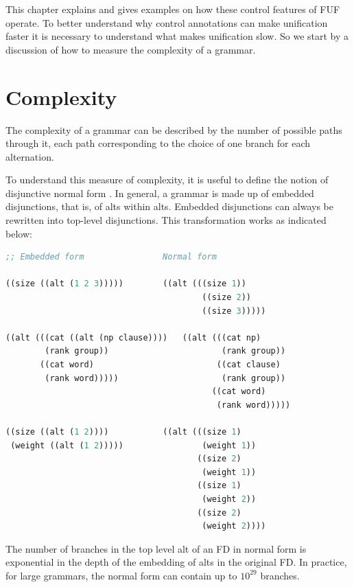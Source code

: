 \documentclass[10pt,a4paper]{report}
\begin{document}
This chapter explains and gives examples on how these control features of
FUF operate.  To better understand why control annotations can make
unification faster it is necessary to understand what makes unification
slow.  So we start by a discussion of how to measure the complexity of a
grammar.

\section{Complexity}
\label{complexity}

The complexity of a grammar can be described by the number of
possible paths through it, each path corresponding to the choice
of one branch for each alternation. 

To understand this measure of complexity, it is useful to define the notion
of disjunctive normal form .  In
general, a grammar is made up of embedded disjunctions, that is, of alts
within alts.  Embedded disjunctions can always be rewritten into top-level
disjunctions.  This transformation works as indicated below:

\begin{lstlisting}[language=Lisp]
;; Embedded form              	Normal form

((size ((alt (1 2 3)))))		((alt (((size 1))
										((size 2))
										((size 3)))))

((alt (((cat ((alt (np clause)))) 	((alt (((cat np)
		(rank group))				        (rank group))
       ((cat word)                         ((cat clause)
        (rank word)))))  	  		        (rank group))
										  ((cat word)
										   (rank word)))))

((size ((alt (1 2))))			((alt (((size 1)
 (weight ((alt (1 2)))))		        (weight 1))
									   ((size 2)
										(weight 1))
									   ((size 1)
										(weight 2))
									   ((size 2)
										(weight 2))))
\end{lstlisting}

The number of branches in the top level alt of an FD in normal form is
exponential in the depth of the embedding of alts in the original FD.  In
practice, for large grammars, the normal form can contain up to $10^{29}$
branches.
\end{document}

